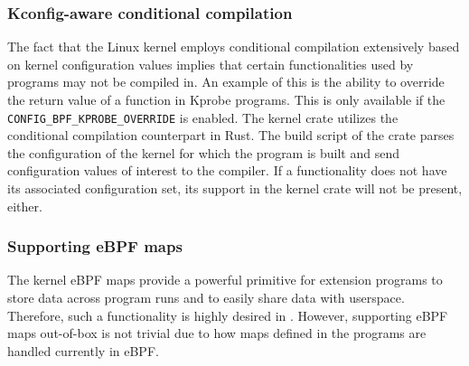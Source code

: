 \subsubsection{Kconfig-aware conditional compilation}
The fact that the Linux kernel employs conditional compilation extensively
    based on kernel configuration values implies that certain functionalities
    used by \projname{} programs may not be compiled in.
An example of this is the ability to override the return value of a function in
    Kprobe programs.
This is only available if the \texttt{CONFIG\_BPF\_KPROBE\_OVERRIDE} is
    enabled.
The \projname{} kernel crate utilizes the conditional compilation counterpart
    in Rust.
The build script of the crate parses the configuration of the kernel for which
    the program is built and send configuration values of interest to the
    compiler.
If a functionality does not have its associated configuration set, its support
    in the kernel crate will not be present, either.

\subsubsection{Supporting eBPF maps}
\label{impl:crate:map}
%
%
The kernel eBPF maps provide a powerful primitive for extension programs to
    store data across program runs and to easily share data with userspace.
Therefore, such a functionality is highly desired in \projname{}.
However, supporting eBPF maps out-of-box is not trivial due to how maps defined
    in the programs are handled currently in eBPF.

